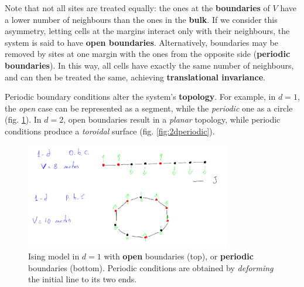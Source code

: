 \documentclass[../template.tex]{subfiles}
\begin{document}
\medskip

Note that not all sites are treated equally: the ones at the \textbf{boundaries} of $V$ have a lower number of neighbours than the ones in the \textbf{bulk}. If we consider this asymmetry, letting cells at the margins interact only with their neighbours, the system is said to have \textbf{open boundaries}. Alternatively, boundaries may be removed by  sites at one margin with the ones from the opposite side (\textbf{periodic boundaries}). In this way, all cells have exactly the same number of neighbours, and can then be treated the same, achieving \textbf{translational invariance}.

\medskip

Periodic boundary conditions alter the system's \textbf{topology}. For example, in $d=1$, the \textit{open} case can be represented as a segment, while the \textit{periodic} one as a circle (fig. \ref{fig:1dperiodic}). In $d=2$, open boundaries result in a \textit{planar} topology, while periodic conditions produce a \textit{toroidal} surface (fig. \ref{fig:2dperiodic}).  

\begin{figure}[H]
    \centering
    \includegraphics[width=0.8\textwidth]{image010.png}
    \caption{Ising model in $d=1$ with \textbf{open} boundaries (top), or \textbf{periodic} boundaries (bottom). Periodic conditions are obtained by \textit{deforming} the initial line to  its two ends.\label{fig:1dperiodic}}
\end{figure}
\end{document}
